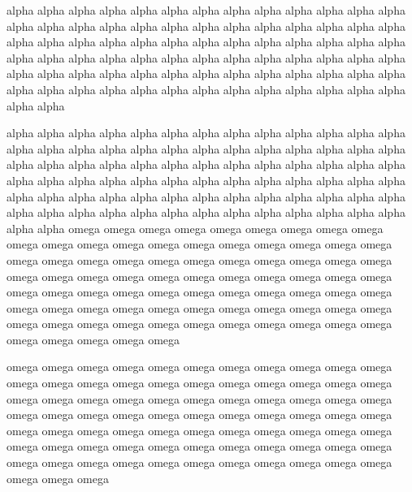 \documentclass[11pt,twocolumn]{article}
\newcommand{\words}[1]{#1 #1 #1 #1 #1 #1 #1 #1 #1 #1 #1 #1 #1 #1 #1 #1 #1 #1 #1 #1 }
\begin{document}
\words{alpha}\words{alpha}\words{alpha}\words{alpha}

\words{alpha}\words{alpha}\words{alpha}\words{alpha}
\newpage
\words{omega}\words{omega}\words{omega}\words{omega}

\words{omega}\words{omega}\words{omega}\words{omega}
\end{document}
